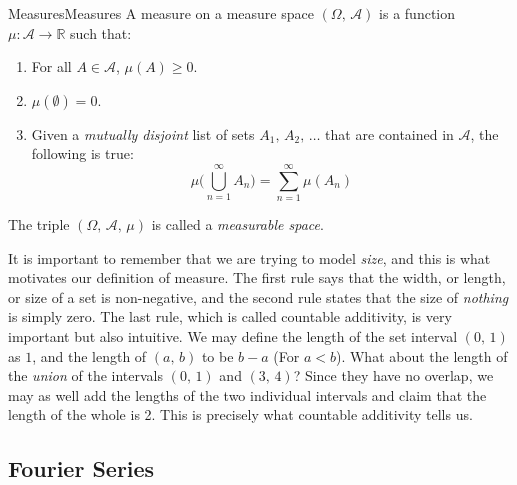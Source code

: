         \begin{ldefinition}{Measures}{Measures}
            A measure on a measure space $(\Omega,\,\mathcal{A})$ is a
            function $\mu:\mathcal{A}\rightarrow\mathbb{R}$ such that:
            \begin{enumerate}
                \item For all $A\in\mathcal{A}$, $\mu(A)\geq{0}$.
                \item $\mu(\emptyset)=0$.
                \item Given a \textit{mutually disjoint} list of sets
                      $A_{1},\,A_{2},\,\dots$ that are contained in
                      $\mathcal{A}$, the following is true:
                      \begin{equation}
                          \mu\Big(\bigcup_{n=1}^{\infty}A_{n}\Big)=
                          \sum_{n=1}^{\infty}\mu(A_{n})
                      \end{equation}
            \end{enumerate}
            The triple $(\Omega,\,\mathcal{A},\,\mu)$ is called a
            \textit{measurable space}.
        \end{ldefinition}
        It is important to remember that we are trying to model \textit{size},
        and this is what motivates our definition of measure. The first rule
        says that the width, or length, or size of a set is non-negative,
        and the second rule states that the size of \textit{nothing} is simply
        zero. The last rule, which is called countable additivity, is
        very important but also intuitive. We may define the length of
        the set interval $(0,\,1)$ as $1$, and the length of
        $(a,\,b)$ to be $b-a$ (For $a<b$). What about the length of the
        \textit{union} of the intervals $(0,\,1)$ and $(3,\,4)$? Since they
        have no overlap, we may as well add the lengths of the two
        individual intervals and claim that the length of the whole is 2.
        This is precisely what countable additivity tells us.
    \subsection{Fourier Series}
